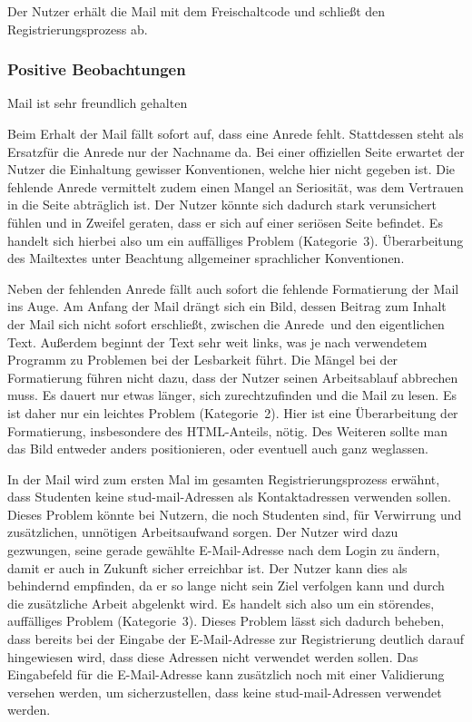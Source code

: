 \label{subsec:freischaltung}
Der Nutzer erhält die Mail mit dem Freischaltcode und schließt den Registrierungsprozess ab.


\subsubsection*{Positive Beobachtungen}
\label{subsubsec:freischaltung_mail_positiv}
Mail ist sehr freundlich gehalten

{
Beim Erhalt der Mail fällt sofort auf, dass eine Anrede fehlt. Stattdessen steht als \glqq Ersatz\grqq für die Anrede nur der Nachname da.
}
{
Bei einer offiziellen Seite erwartet der Nutzer die Einhaltung gewisser Konventionen, welche hier nicht gegeben ist. Die fehlende Anrede vermittelt zudem einen Mangel an Seriosität, was dem Vertrauen in die Seite abträglich ist. Der Nutzer könnte sich dadurch stark verunsichert fühlen und in Zweifel geraten, dass er sich auf einer seriösen Seite befindet. Es handelt sich hierbei also um ein auffälliges Problem (Kategorie~3).
}
{
Überarbeitung des Mailtextes unter Beachtung allgemeiner sprachlicher Konventionen.
}

{
Neben der fehlenden Anrede fällt auch sofort die fehlende Formatierung der Mail ins Auge. Am Anfang der Mail drängt sich ein Bild, dessen Beitrag zum Inhalt der Mail sich nicht sofort erschließt, zwischen die \glqq Anrede\grqq ~und den eigentlichen Text. Außerdem beginnt der Text sehr weit links, was je nach verwendetem Programm zu Problemen bei der Lesbarkeit führt.
}
{
Die Mängel bei der Formatierung führen nicht dazu, dass der Nutzer seinen Arbeitsablauf abbrechen muss. Es dauert nur etwas länger, sich zurechtzufinden und die Mail zu lesen. Es ist daher nur ein leichtes Problem (Kategorie~2).
}
{
Hier ist eine Überarbeitung der Formatierung, insbesondere des HTML-Anteils, nötig. Des Weiteren sollte man das Bild entweder anders positionieren, oder eventuell auch ganz weglassen.
}

{
In der Mail wird zum ersten Mal im gesamten Registrierungsprozess erwähnt, dass Studenten keine stud\hbox{-}mail-Adressen als Kontaktadressen verwenden sollen.
}
{
Dieses Problem könnte bei Nutzern, die noch Studenten sind, für Verwirrung und zusätzlichen, unnötigen Arbeitsaufwand sorgen. Der Nutzer wird dazu gezwungen, seine gerade gewählte E\hbox{-}Mail-Adresse nach dem Login zu ändern, damit er auch in Zukunft sicher erreichbar ist. Der Nutzer kann dies als behindernd empfinden, da er so lange nicht sein Ziel verfolgen kann und durch die zusätzliche Arbeit abgelenkt wird. Es handelt sich also um ein störendes, auffälliges Problem (Kategorie~3).
}
{
Dieses Problem lässt sich dadurch beheben, dass bereits bei der Eingabe der E\hbox{-}Mail-Adresse zur Registrierung deutlich darauf hingewiesen wird, dass diese Adressen nicht verwendet werden sollen. Das Eingabefeld für die E\hbox{-}Mail-Adresse kann zusätzlich noch mit einer Validierung versehen werden, um sicherzustellen, dass keine stud\hbox{-}mail-Adressen verwendet werden.
}


